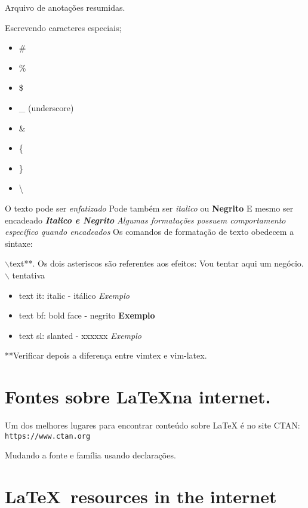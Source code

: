 \documentclass[a4paper, 12pt]{article}
\begin{document}
Arquivo de anotações resumidas.

Escrevendo caracteres especiais;
\begin{itemize}
        \item \#
        \item \%
        \item \$
        \item \_ (underscore)
        \item \&
        \item \{
        \item \}
        \item \textbackslash
\end{itemize}

O texto pode ser \emph{enfatizado}
Pode também ser \textit{italico} ou \textbf{Negrito}
E mesmo ser encadeado \textbf{\textit{Italico e Negrito}}
\emph{Algumas formatações possuem \emph{comportamento específico} quando encadeados}
Os comandos de formatação de texto obedecem a sintaxe: 

$\backslash$text**. Os dois asteriscos são referentes aos efeitos:
Vou tentar aqui um negócio. $\backslash$ tentativa

\begin{itemize}
    \item{text it: italic - itálico}
        \textit{Exemplo}
    \item{text bf: bold face - negrito}
        \textbf{Exemplo}
    \item{text sl: slanted - xxxxxx}
        \textsl{Exemplo}
\end{itemize}

**Verificar depois a diferença entre vimtex e vim-latex.

\section{\textsf{Fontes sobre \LaTeX na internet.}}

Um dos melhores lugares para encontrar conteúdo sobre LaTeX é no site CTAN:
\texttt{https://www.ctan.org}



Mudando a fonte e família usando declarações.

\section{\sffamily\LaTeX\ resources in the internet}
\end{document}
